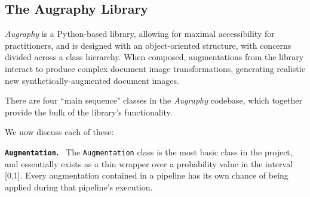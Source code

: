 \documentclass[runningheads]{llncs}
\begin{document}
\begin{table}[]
    \centering
    \caption{Individual \emph{Augraphy} augmentations for each augmentation phase, in suggested position within the pipeline. Augmentations that work well in more than one phase are listed in the last column.}
    \label{tab:augmentations}
\end{table}

\subsection{The Augraphy Library}
\emph{Augraphy} is a Python-based library, allowing for maximal accessibility for practitioners, and is designed with an object-oriented structure, with concerns divided across a class hierarchy.
When composed, augmentations from the library interact to produce complex document image transformations, generating realistic new synthetically-augmented document images.

There are four ``main sequence" classes in the \emph{Augraphy} codebase, which together provide the bulk of the library's functionality.

We now discuss each of these:

\smallskip
\noindent\textbf{\texttt{Augmentation}.} ~The \texttt{Augmentation} class is the most basic class in the project, and essentially exists as a thin wrapper over a probability value in the interval [0,1].
Every augmentation contained in a pipeline has its own chance of being applied during that pipeline's execution.
\end{document}
